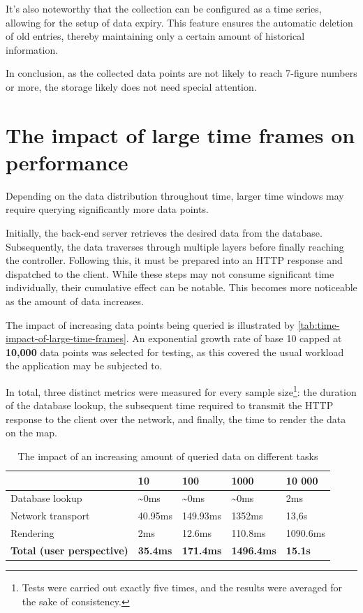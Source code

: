 \documentclass[FM,BP,EN,fonts]{tulthesis}
\begin{document}
It's also noteworthy that the collection can be configured as a time series, allowing for the setup of data expiry. This feature ensures the automatic deletion of old entries, thereby maintaining only a certain amount of historical information.

In conclusion, as the collected data points are not likely to reach 7-figure numbers or more, the storage likely does not need special attention.

\section{The impact of large time frames on performance}
Depending on the data distribution throughout time, larger time windows may require querying significantly more data points. 

Initially, the back-end server retrieves the desired data from the database. Subsequently, the data traverses through multiple layers before finally reaching the controller. Following this, it must be prepared into an HTTP response and dispatched to the client. While these steps may not consume significant time individually, their cumulative effect can be notable. This becomes more noticeable as the amount of data increases. 

The impact of increasing data points being queried is illustrated by \autoref{tab:time-impact-of-large-time-frames}. An exponential growth rate of base 10 capped at \textbf{10,000} data points was selected for testing, as this covered the usual workload the application may be subjected to.

In total, three distinct metrics were measured for every sample size\footnote{Tests were carried out exactly five times, and the results were averaged for the sake of consistency.}: the duration of the database lookup, the subsequent time required to transmit the HTTP response to the client over the network, and finally, the time to render the data on the map.

\begin{table}[ht]
\centering
\begin{tabular}{|l|l|l|l|l|}
\hline
                  & \textbf{10}  & \textbf{100} & \textbf{1000} & \textbf{10 000} \\ \hline
Database lookup   & \~{}0ms          & \~{}0ms          & \~{}0ms           & 2ms             \\ \hline
Network transport & 40.95ms          & 149.93ms          & 1352ms           & 13,6s             \\ \hline
Rendering         & 2ms          & 12.6ms          & 110.8ms           & 1090.6ms             \\ \hline
\textbf{Total (user perspective)}    & \textbf{35.4ms} & \textbf{171.4ms} & \textbf{1496.4ms}  & \textbf{15.1s}    \\ \hline
\end{tabular}
\caption{The impact of an increasing amount of queried data on different tasks}
    \label{tab:time-impact-of-large-time-frames}
\end{table}
\end{document}
